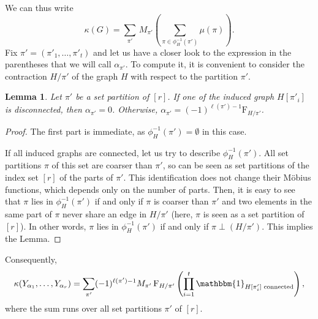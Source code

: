 \documentclass[12pt,a4paper,reqno]{amsart}
\newtheorem{lemma}{Lemma}[section]
\theoremstyle{remark}
\newcommand{\SF}{\mathrm{F}}
\newcommand{\pa}{\alpha}
\begin{document}
We can thus write
$$\kappa(G)= \sum_{\pi'}\, M_{\pi'} \! \left( \sum_{\pi \in \phi_H^{-1}(\pi')} \mu(\pi) \right).$$
Fix $\pi'=(\pi'_1,\dots,\pi'_t)$ and let us have a closer look to the expression in the parentheses that we will call $\pa_{\pi'}$. To compute it, it is convenient to consider the contraction $H/\pi'$ of the graph $H$ with respect to the partition $\pi'$.
\begin{lemma} 
    Let $\pi'$ be a set partition of $[r]$. If one of the induced graph $H[\pi'_i]$ is disconnected, then $\pa_{\pi'}=0$. Otherwise, $\pa_{\pi'}=(-1)^{\ell(\pi')-1} \SF_{H/\pi'}$.
\end{lemma}
\begin{proof}
The first part is immediate, as $\phi_H^{-1}(\pi')=\emptyset$ in this case.\bigskip

\noindent If all induced graphs are connected, let us try to describe $\phi_H^{-1}(\pi')$. All set partitions $\pi$ of this set are coarser than $\pi'$, so can be seen as set partitions of the index set $[r]$ of the parts of $\pi'$. This identification does not change their M\"obius functions, which depends only on the number of parts. Then, it is easy to see that $\pi$ lies in $\phi_H^{-1}(\pi')$ if and only if $\pi$ is coarser than $\pi'$ and  two elements in the same part of $\pi$ never share an edge in $H/\pi'$ (here, $\pi$ is seen as a set partition of $[r]$). In other words, $\pi$ lies in $\phi_H^{-1}(\pi')$ if and only if $\pi \perp (H/\pi')$. This implies the Lemma.
\end{proof}
\bigskip

\noindent Consequently,
\begin{equation}\label{eq:jointcumulantgroup}
\kappa(Y_{\alpha_1},\dots, Y_{\alpha_r}) =
\sum_{\pi'} (-1)^{\ell(\pi')-1} M_{\pi'}\, \SF_{H/\pi'}\left( \prod_{i=1}^t \mathbbm{1}_{H[\pi'_i]\text{ connected}}\right),
\end{equation}
where the sum runs over all set partitions $\pi'$ of $[r]$.\medskip
\end{document}
